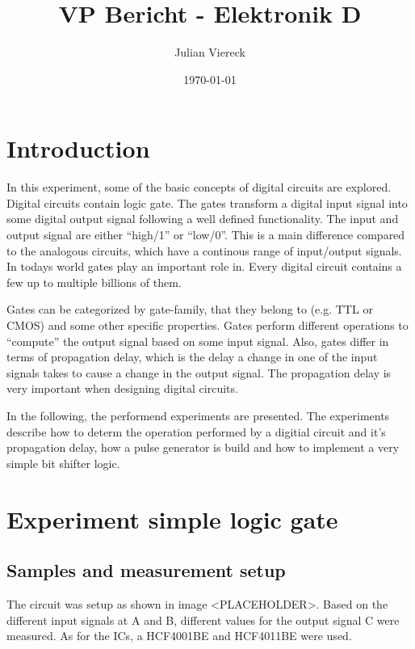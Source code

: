 \documentclass[journal]{IEEEtran}
\title{VP Bericht - Elektronik D}
\author{Julian Viereck}
\date{\today}                                           %
\begin{document}
\maketitle

\begin{abstract}
\end{abstract}

\tableofcontents

\section{Introduction}

In this experiment, some of the basic concepts of digital circuits are explored.
Digital circuits contain logic gate. The gates transform a
digital input signal into some digital output signal following a well defined functionality.
The input and output signal are either ``high/1'' or ``low/0''. This is a main
difference compared to the analogous circuits, which have a continous range of
input/output signals. In todays world gates play an important role in. Every
digital circuit contains a few up to multiple billions of them.

Gates can be categorized by gate-family, that they belong to (e.g. TTL or CMOS)
and some other specific properties. Gates perform different operations to
``compute'' the output signal based on some input signal. Also, gates differ in
terms of propagation delay, which is the delay a change in one of the input
signals takes to cause a change in the output signal. The propagation delay is
very important when designing digital circuits.

In the following, the performend experiments are presented. The experiments
describe how to determ the operation performed by a digitial circuit and it's
propagation delay, how a pulse generator is build and how to implement a very
simple bit shifter logic.

\section{Experiment simple logic gate}

\subsection{Samples and measurement setup}

The circuit was setup as shown in image <PLACEHOLDER>. Based on the
different input signals at A and B, different values for the output signal C
were measured. As for the ICs, a HCF4001BE and HCF4011BE were used.
\end{document}

